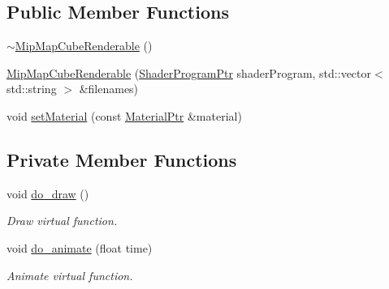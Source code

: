 \subsection*{Public Member Functions}
\begin{DoxyCompactItemize}
\item 
\hyperlink{classMipMapCubeRenderable_a891b6fb7b140fe031308f0fdb547eeb4}{$\sim$\+Mip\+Map\+Cube\+Renderable} ()
\item 
\hyperlink{classMipMapCubeRenderable_ad73277c8783cdd3e609a06a9ac3e103c}{Mip\+Map\+Cube\+Renderable} (\hyperlink{ShaderProgram_8hpp_af8e4af1ad4c53875ee5d32ab7e1f4966}{Shader\+Program\+Ptr} shader\+Program, std\+::vector$<$ std\+::string $>$ \&filenames)
\item 
void \hyperlink{classMipMapCubeRenderable_afb53a094d737952ae1053fa0eaf20812}{set\+Material} (const \hyperlink{Material_8hpp_a1d47cd05ca683e287435cf0b363fbfe1}{Material\+Ptr} \&material)
\end{DoxyCompactItemize}
\subsection*{Private Member Functions}
\begin{DoxyCompactItemize}
\item 
void \hyperlink{classMipMapCubeRenderable_a739176af783a8cb15239d86b723f9882}{do\+\_\+draw} ()
\begin{DoxyCompactList}\small\item\em Draw virtual function. \end{DoxyCompactList}\item 
void \hyperlink{classMipMapCubeRenderable_a24b35ddfe3681e641db25ed3dd46fda6}{do\+\_\+animate} (float time)
\begin{DoxyCompactList}\small\item\em Animate virtual function. \end{DoxyCompactList}\end{DoxyCompactItemize}
